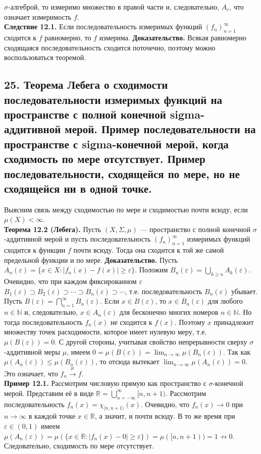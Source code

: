 \documentclass[12pt]{article}
\begin{document}
$\sigma$-алгеброй, то измеримо множество в правой части и, следовательно, $A_c$, что означает измеримость $f$. \\\textbf{Следствие 12.1.} Если последовательность измеримых функций $(f_n)_{n=1}^\infty$ сходится к $f$ равномерно, то $f$ измерима. \textbf{Доказательство.} Всякая равномерно сходящаяся последовательность сходится поточечно, поэтому можно воспользоваться теоремой.

\subsection*{25. Теорема Лебега о сходимости последовательности измеримых функций на
пространстве с полной конечной sigma-аддитивной мерой. Пример последовательности
на пространстве с sigma-конечной мерой, когда сходимость по мере отсутствует. Пример
последовательности, сходящейся по мере, но не сходящейся ни в одной точке.}
Выясним связь между сходимостью по мере и сходимостью почти всюду, если $\mu(X)<\infty$. \\\textbf{Теорема 12.2 (Лебега).} Пусть $(X,\Sigma,\mu)$ — пространство с полной конечной $\sigma$-аддитивной мерой и пусть последовательность $(f_n)_{n=1}^\infty$ измеримых функций сходится к функции $f$ почти всюду. Тогда она сходится к той же самой предельной функции и по мере. \textbf{Доказательство.} Пусть $A_n(\varepsilon)=\{x\in X:|f_n(x)-f(x)|\geq\varepsilon\}$. Положим $B_n(\varepsilon)=\bigcup_{k\geq n}A_k(\varepsilon)$. Очевидно, что при каждом фиксированном $\varepsilon$ $B_1(\varepsilon)\supset B_2(\varepsilon)\supset\cdots\supset B_n(\varepsilon)\supset\cdots$, т.е. последовательность $B_n(\varepsilon)$ убывает. Пусть $B(\varepsilon)=\bigcap_{n=1}^\infty B_n(\varepsilon)$. Если $x\in B(\varepsilon)$, то $x\in B_n(\varepsilon)$ для любого $n\in\mathbb{N}$ и, следовательно, $x\in A_n(\varepsilon)$ для бесконечно многих номеров $n\in\mathbb{N}$. Но тогда последовательность $f_n(x)$ не сходится к $f(x)$. Поэтому $x$ принадлежит множеству точек расходимости, которое имеет нулевую меру, т.е. $\mu(B(\varepsilon))=0$. С другой стороны, учитывая свойство непрерывности сверху $\sigma$-аддитивной меры $\mu$, имеем $0=\mu(B(\varepsilon))=\lim_{n\to\infty}\mu(B_n(\varepsilon))$. Так как $\mu(A_n(\varepsilon))\leq\mu(B_n(\varepsilon))$, то отсюда вытекает $\lim_{n\to\infty}\mu(A_n(\varepsilon))=0$. Это означает, что $f_n\overset{\mu}{\longrightarrow}f$. \\\textbf{Пример 12.1.} Рассмотрим числовую прямую как пространство с $\sigma$-конечной мерой. Представим её в виде $\mathbb{R}=\bigcup_{n=-\infty}^\infty[n,n+1)$. Рассмотрим последовательность $f_n(x)=\chi_{[n,n+1)}(x)$. Очевидно, что $f_n(x)\to 0$ при $n\to\infty$ в каждой точке $x\in\mathbb{R}$, а значит, и почти всюду. В то же время при $\varepsilon\in(0,1)$ имеем $\mu(A_n(\varepsilon))=\mu(\{x\in\mathbb{R}:|f_n(x)-0|\geq\varepsilon\})=\mu([n,n+1))=1\not\to 0$. Следовательно, сходимость по мере отсутствует.
\end{document}
